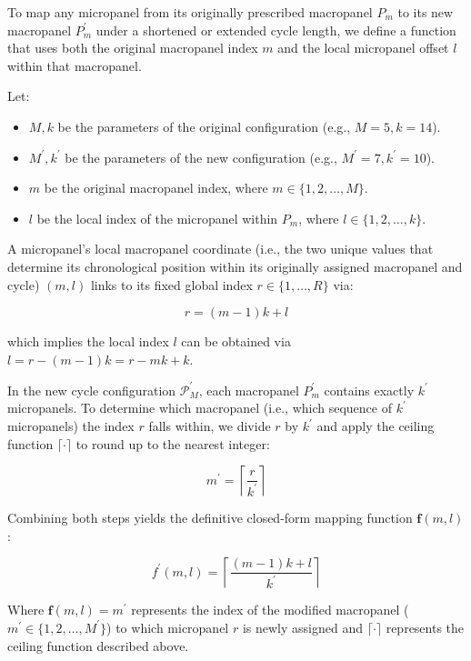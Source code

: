 \documentclass[
  number]{elsarticle}
\providecommand{\tightlist}{%
  \setlength{\itemsep}{0pt}\setlength{\parskip}{0pt}}
\begin{document}
To map any micropanel from its originally prescribed macropanel \(P_m\)
to its new macropanel \(P^\prime_m\) under a shortened or extended cycle
length, we define a function that uses both the original macropanel
index \(m\) and the local micropanel offset \(l\) within that
macropanel.

Let:

\begin{itemize}
\tightlist
\item
  \(M, k\) be the parameters of the original configuration (e.g.,
  \(M=5, k=14\)).
\item
  \(M^\prime, k^\prime\) be the parameters of the new configuration
  (e.g., \(M^\prime=7, k^\prime=10\)).
\item
  \(m\) be the original macropanel index, where
  \(m \in \{1, 2, \dots, M\}\).
\item
  \(l\) be the local index of the micropanel within \(P_m\), where
  \(l \in \{1, 2, \dots, k\}\).
\end{itemize}

A micropanel's local macropanel coordinate (i.e., the two unique values
that determine its chronological position within its originally assigned
macropanel and cycle) \((m,l)\) links to its fixed global index
\(r \in \{1,\ldots,R\}\) via:

\[r = (m - 1)k + l\]

which implies the local index \(l\) can be obtained via
\(l = r - (m - 1)k = r - mk + k\).

In the new cycle configuration \(\mathcal{P}^\prime_M\), each macropanel
\(P^\prime_m\) contains exactly \(k^\prime\) micropanels. To determine
which macropanel (i.e., which sequence of \(k^\prime\) micropanels) the
index \(r\) falls within, we divide \(r\) by \(k^\prime\) and apply the
ceiling function \(\lceil \cdot \rceil\) to round up to the nearest
integer:

\[m^\prime = \left\lceil \frac{r}{k^\prime} \right\rceil\]

Combining both steps yields the definitive closed-form mapping function
\(\mathbf{f}(m,l)\):

\[f^\prime(m,l) = \left\lceil \frac{(m - 1) k + l}{k^\prime} \right\rceil\]

Where \(\mathbf{f}(m,l) = m^\prime\) represents the index of the
modified macropanel (\(m^\prime \in \{1, 2, \dots, M^\prime\}\)) to
which micropanel \(r\) is newly assigned and \(\lceil \cdot \rceil\)
represents the ceiling function described above.
\end{document}
